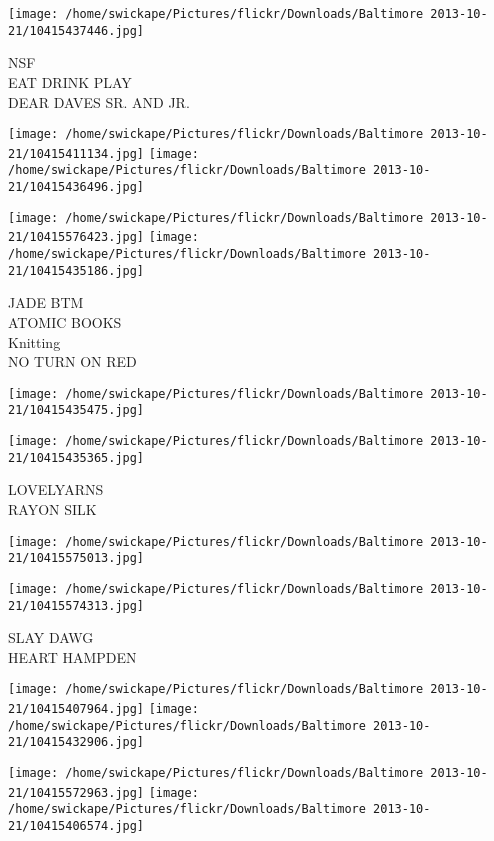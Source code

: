 \documentclass[10pt,letterpaper]{article}
\begin{document}
\vspace{0.25in}
\texttt{[image: /home/swickape/Pictures/flickr/Downloads/Baltimore 2013-10-21/10415437446.jpg]}

NSF\\
EAT DRINK PLAY\\
DEAR DAVES SR. AND JR.\\
\pagebreak

\texttt{[image: /home/swickape/Pictures/flickr/Downloads/Baltimore 2013-10-21/10415411134.jpg]}
\texttt{[image: /home/swickape/Pictures/flickr/Downloads/Baltimore 2013-10-21/10415436496.jpg]}

\texttt{[image: /home/swickape/Pictures/flickr/Downloads/Baltimore 2013-10-21/10415576423.jpg]}
\texttt{[image: /home/swickape/Pictures/flickr/Downloads/Baltimore 2013-10-21/10415435186.jpg]}

JADE BTM\\
ATOMIC BOOKS\\
Knitting\\
NO TURN ON RED\\
\pagebreak

\texttt{[image: /home/swickape/Pictures/flickr/Downloads/Baltimore 2013-10-21/10415435475.jpg]}

\vspace{0.25in}
\texttt{[image: /home/swickape/Pictures/flickr/Downloads/Baltimore 2013-10-21/10415435365.jpg]}

LOVELYARNS\\
RAYON SILK\\
\pagebreak

\texttt{[image: /home/swickape/Pictures/flickr/Downloads/Baltimore 2013-10-21/10415575013.jpg]}

\vspace{0.25in}
\texttt{[image: /home/swickape/Pictures/flickr/Downloads/Baltimore 2013-10-21/10415574313.jpg]}

SLAY DAWG\\
HEART HAMPDEN\\
\pagebreak

\texttt{[image: /home/swickape/Pictures/flickr/Downloads/Baltimore 2013-10-21/10415407964.jpg]}
\texttt{[image: /home/swickape/Pictures/flickr/Downloads/Baltimore 2013-10-21/10415432906.jpg]}

\texttt{[image: /home/swickape/Pictures/flickr/Downloads/Baltimore 2013-10-21/10415572963.jpg]}
\texttt{[image: /home/swickape/Pictures/flickr/Downloads/Baltimore 2013-10-21/10415406574.jpg]}
\end{document}
